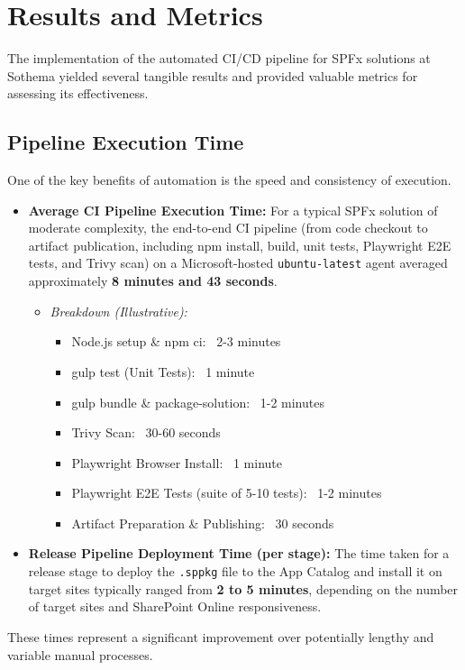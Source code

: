 \chapter{Results and Metrics}
\label{chapter:ResultsMetrics}

The implementation of the automated CI/CD pipeline for SPFx solutions at Sothema yielded several tangible results and provided valuable metrics for assessing its effectiveness.

\section{Pipeline Execution Time}
\label{sec:PipelineExecutionTime}

One of the key benefits of automation is the speed and consistency of execution.
\begin{itemize}
    \item \textbf{Average CI Pipeline Execution Time:} For a typical SPFx solution of moderate complexity, the end-to-end CI pipeline (from code checkout to artifact publication, including npm install, build, unit tests, Playwright E2E tests, and Trivy scan) on a Microsoft-hosted \texttt{ubuntu-latest} agent averaged approximately \textbf{8 minutes and 43 seconds}.
    \begin{itemize}
        \item \textit{Breakdown (Illustrative):}
        \begin{itemize}
            \item Node.js setup \& npm ci: ~2-3 minutes
            \item gulp test (Unit Tests): ~1 minute
            \item gulp bundle \& package-solution: ~1-2 minutes
            \item Trivy Scan: ~30-60 seconds
            \item Playwright Browser Install: ~1 minute
            \item Playwright E2E Tests (suite of 5-10 tests): ~1-2 minutes
            \item Artifact Preparation \& Publishing: ~30 seconds
        \end{itemize}
    \end{itemize}
    \item \textbf{Release Pipeline Deployment Time (per stage):} The time taken for a release stage to deploy the \texttt{.sppkg} file to the App Catalog and install it on target sites typically ranged from \textbf{2 to 5 minutes}, depending on the number of target sites and SharePoint Online responsiveness.
\end{itemize}
These times represent a significant improvement over potentially lengthy and variable manual processes.

